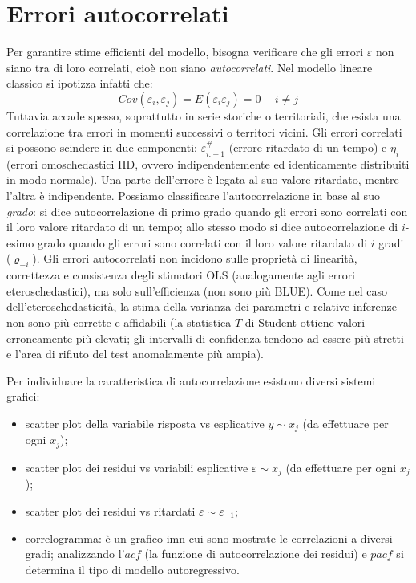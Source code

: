 \documentclass[a4page, 11pt]{article} %
\begin{document}
\section{Errori autocorrelati}
Per garantire stime efficienti del modello, bisogna verificare che gli errori $\varepsilon$ non siano tra di loro correlati, cioè non siano \textit{autocorrelati}.
Nel modello lineare classico si ipotizza infatti che:
\begin{equation*}
  Cov(\varepsilon_i, \varepsilon_j) = E(\varepsilon_i \varepsilon_j) = 0 \hspace{15pt} i \neq j
\end{equation*}
Tuttavia accade spesso, soprattutto in serie storiche o territoriali, che esista una correlazione tra errori in momenti successivi o territori vicini.
Gli errori correlati si possono scindere in due componenti: %
$\varepsilon_{i.-1}^\#$ (errore ritardato di un tempo) e $\eta_i$ (errori omoschedastici IID, ovvero indipendentemente ed identicamente distribuiti in modo normale).
Una parte dell'errore è legata al suo valore ritardato, mentre l'altra è indipendente.
Possiamo classificare l’autocorrelazione in base al suo \textit{grado}: si dice autocorrelazione di primo grado quando gli errori sono correlati con il loro valore ritardato di un tempo; allo stesso modo si dice autocorrelazione di $i$-esimo grado quando gli errori sono correlati con il loro valore ritardato di $i$ gradi ($\varrho_{-i}$).
Gli errori autocorrelati non incidono sulle proprietà di linearità, correttezza e consistenza degli stimatori OLS (analogamente agli errori eteroschedastici), ma solo sull’efficienza (non sono più BLUE).
Come nel caso dell’eteroschedasticità, la stima della varianza dei parametri e relative inferenze non sono più corrette e affidabili (la statistica $T$ di Student ottiene valori erroneamente più elevati; gli intervalli di confidenza tendono ad essere più stretti e l'area di rifiuto del test anomalamente più ampia).

Per individuare la caratteristica di autocorrelazione esistono diversi sistemi grafici:
\begin{itemize}[noitemsep]
  \item scatter plot della variabile risposta vs esplicative $y \sim x_j$ (da effettuare per ogni $x_j$);
  \item scatter plot dei residui vs variabili esplicative $\varepsilon \sim x_j$ (da effettuare per ogni $x_j$);
  \item scatter plot dei residui vs ritardati $\varepsilon \sim \varepsilon_{-1}$;
  \item correlogramma: è un grafico imn cui sono mostrate le correlazioni a diversi gradi; analizzando l'$acf$ (la funzione di autocorrelazione dei residui) e $pacf$ si determina il tipo di modello autoregressivo.
\end{itemize}
\end{document}
